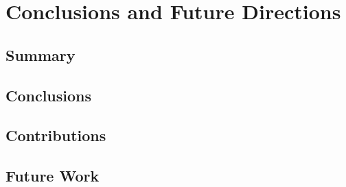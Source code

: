 
\chapter{Conclusions and Future Directions} %



\ifpdf
    \graphicspath{{6_conclusions/figures/PNG/}{6_conclusions/figures/PDF/}{6_conclusions/figures/}}
\else
    \graphicspath{{6_conclusions/figures/EPS/}{6_conclusions/figures/}}
\fi




\section{Summary}


\section{Conclusions}




\section{Contributions}


\section{Future Work}



